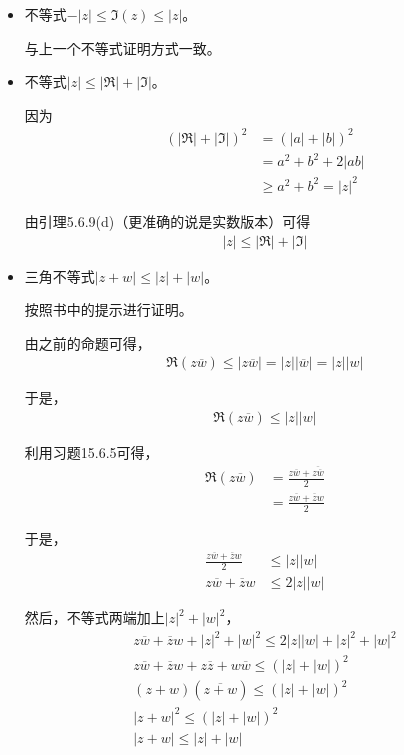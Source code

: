 \documentclass{article}
\begin{document}
\begin{itemize}
  \item 不等式$-|z| \leq \mathfrak{I}(z) \leq |z|$。

        与上一个不等式证明方式一致。

  \item 不等式$|z| \leq |\mathfrak{R}| + |\mathfrak{I}|$。

        因为
        \begin{align*}
          (|\mathfrak{R}| + |\mathfrak{I}|)^2
           & = (|a| + |b|)^2        \\
           & = a^2 + b^2 + 2|ab|    \\
           & \geq a^2 + b^2 = |z|^2
        \end{align*}

        由引理5.6.9(d)（更准确的说是实数版本）可得
        \begin{align*}
          |z| \leq |\mathfrak{R}| + |\mathfrak{I}|
        \end{align*}

  \item 三角不等式$|z + w| \leq |z| + |w|$。

        按照书中的提示进行证明。

        由之前的命题可得，
        \begin{align*}
          \mathfrak{R}(z\overline{w}) \leq |z\overline{w}| = |z||\overline{w}| = |z||w|
        \end{align*}

        于是，
        \begin{align*}
          \mathfrak{R}(z\overline{w}) \leq |z||w|
        \end{align*}

        利用习题15.6.5可得，
        \begin{align*}
          \mathfrak{R}(z\overline{w}) & = \frac{z\overline{w} + \overline{z\overline{w}}}{2} \\
                                      & = \frac{z\overline{w} + \overline{z}w}{2}
        \end{align*}

        于是，
        \begin{align*}
          \frac{z\overline{w} + \overline{z}w}{2} & \leq |z||w|  \\
          z\overline{w} + \overline{z}w           & \leq 2|z||w|
        \end{align*}

        然后，不等式两端加上$|z|^2 + |w|^2$，
        \begin{align*}
          z\overline{w} + \overline{z}w + |z|^2 + |w|^2 \leq 2|z||w| + |z|^2 + |w|^2        \\
          z\overline{w} + \overline{z}w + z\overline{z} + w\overline{w}  \leq (|z| + |w|)^2 \\
          (z + w)(\overline{z + w}) \leq (|z| + |w|)^2                                      \\
          |z + w|^2 \leq (|z| + |w|)^2                                                      \\
          |z + w| \leq |z| + |w|
        \end{align*}
\end{itemize}
\end{document}
